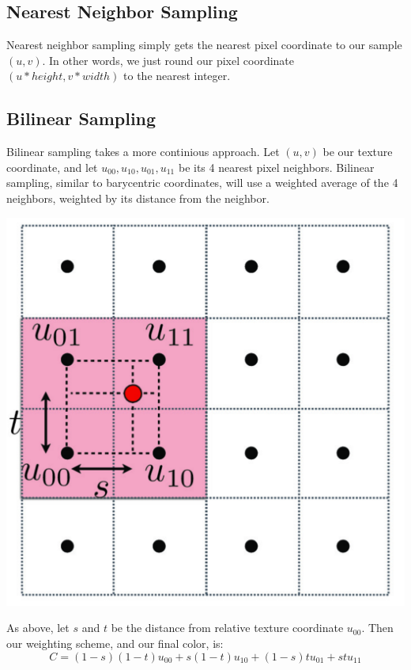 \documentclass{article}
\begin{document}
\subsection{Nearest Neighbor Sampling}
Nearest neighbor sampling simply gets the nearest pixel coordinate to our sample $(u, v)$. In other words, we just round our pixel coordinate $(u * height, v * width)$ to the nearest integer. 
\subsection{Bilinear Sampling}
Bilinear sampling takes a more continious approach. Let $(u, v)$ be our texture coordinate, and let $u_{00}, u_{10}, u_{01}, u_{11}$ be its 4 nearest pixel neighbors. Bilinear sampling, similar to barycentric coordinates, will use a weighted average of the 4 neighbors, weighted by its distance from the neighbor.  
\begin{center}
    \includegraphics[]{task 5/bilinear.png}
\end{center}
As above, let $s$ and $t$ be the distance from relative texture coordinate $u_{00}$. Then our weighting scheme, and our final color, is:
$$C = (1 - s)(1 - t)u_{00} + s(1 - t)u_{10} + (1 - s)t u_{01} + stu_{11}$$
\end{document}
